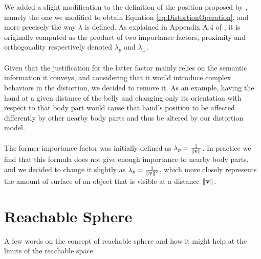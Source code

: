 We added a slight modification to the definition of the position proposed by \cite{molla2017egocentric}, namely the one we modified to obtain Equation \ref{eq:DistortionOperation}, and more precisely the way $\lambda $ is defined. As explained in Appendix A.4 of \cite{molla2016precise}, it is originally computed as the product of two importance factors, proximity and orthogonality respectively denoted $\lambda_p$ and $\lambda_\bot $.
\\\\
Given that the justification for the latter factor mainly relies on the semantic information it conveys, and considering that it would introduce complex behaviors in the distortion, we decided to remove it. As an example, having the hand at a given distance of the belly and changing only its orientation with respect to that body part would cause that hand's position to be affected differently by other nearby body parts and thus be altered by our distortion model.
\\\\
The former importance factor was initially defined as $\lambda_p = \frac{1}{\lVert\mathbf{v}\rVert}$. In practice we find that this formula does not give enough importance to nearby body parts, and we decided to change it slightly as $\lambda_p = \frac{1}{\lVert\mathbf{v}\rVert^2}$, which more closely represents the amount of surface of an object that is visible at a distance $\lVert\mathbf{v}\rVert$.

\section{Reachable Sphere}

A few words on the concept of reachable sphere and how it might help at the limits of the reachable space.
